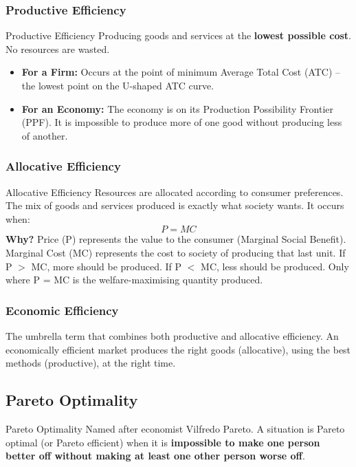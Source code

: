 \documentclass[11pt, a4paper, twoside]{book}
\begin{document}
\subsubsection{Productive Efficiency}

\begin{keyterm}{Productive Efficiency}
Producing goods and services at the \textbf{lowest possible cost}. No resources are wasted.
\begin{itemize}
  \item \textbf{For a Firm:} Occurs at the point of minimum Average Total Cost (ATC) -- the lowest point on the U-shaped ATC curve.
  \item \textbf{For an Economy:} The economy is on its Production Possibility Frontier (PPF). It is impossible to produce more of one good without producing less of another.
\end{itemize}
\end{keyterm}

\subsubsection{Allocative Efficiency}

\begin{keyterm}{Allocative Efficiency}
Resources are allocated according to consumer preferences. The mix of goods and services produced is exactly what society wants. It occurs when:
\[ P = MC \]
\textbf{Why?} Price (P) represents the value to the consumer (Marginal Social Benefit). Marginal Cost (MC) represents the cost to society of producing that last unit. If P $>$ MC, more should be produced. If P $<$ MC, less should be produced. Only where P = MC is the welfare-maximising quantity produced.
\end{keyterm}

\subsubsection{Economic Efficiency}

The umbrella term that combines both productive and allocative efficiency. An economically efficient market produces the right goods (allocative), using the best methods (productive), at the right time.

\subsection{Pareto Optimality}

\begin{keyterm}{Pareto Optimality}
Named after economist Vilfredo Pareto. A situation is Pareto optimal (or Pareto efficient) when it is \textbf{impossible to make one person better off without making at least one other person worse off}.
\end{keyterm}
\end{document}
